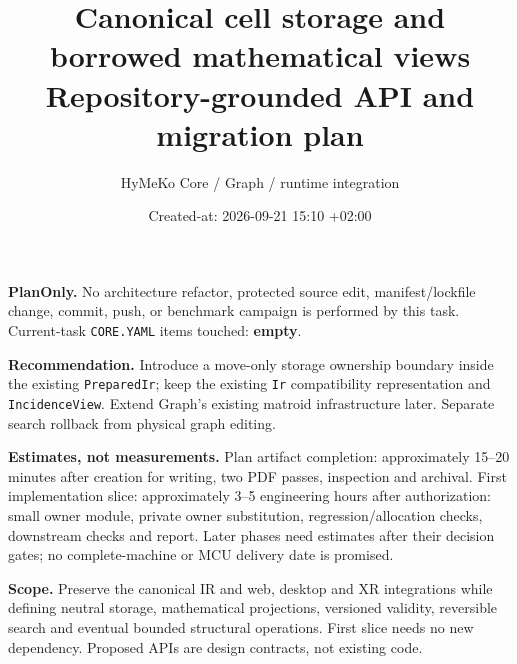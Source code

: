 \documentclass[10pt,a4paper]{article}
\title{Canonical cell storage and borrowed mathematical views\\Repository-grounded API and migration plan}
\author{HyMeKo Core / Graph / runtime integration}
\date{Created-at: 2026-09-21 15:10 +02:00}
\newcommand{\code}[1]{{\small\nolinkurl{#1}}}
\begin{document}
\maketitle
\noindent\textbf{PlanOnly.} No architecture refactor, protected source edit, manifest/lockfile change, commit, push, or benchmark campaign is performed by this task. Current-task \code{CORE.YAML} items touched: \textbf{empty}.

\medskip
\noindent\textbf{Recommendation.} Introduce a move-only storage ownership boundary inside the existing \code{PreparedIr}; keep the existing \code{Ir} compatibility representation and \code{IncidenceView}. Extend Graph's existing matroid infrastructure later. Separate search rollback from physical graph editing.

\medskip
\noindent\textbf{Estimates, not measurements.} Plan artifact completion: approximately 15--20 minutes after creation for writing, two PDF passes, inspection and archival. First implementation slice: approximately 3--5 engineering hours after authorization: small owner module, private owner substitution, regression/allocation checks, downstream checks and report. Later phases need estimates after their decision gates; no complete-machine or MCU delivery date is promised.

\medskip
\noindent\textbf{Scope.} Preserve the canonical IR and web, desktop and XR integrations while defining neutral storage, mathematical projections, versioned validity, reversible search and eventual bounded structural operations. First slice needs no new dependency. Proposed APIs are design contracts, not existing code.
\tableofcontents
\newpage
\end{document}
